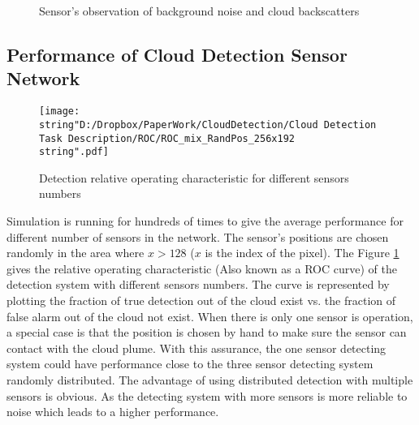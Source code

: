 \begin{figure}
\hfill{}\hfill{}\hfill{}\caption{Sensor's observation of background noise and cloud backscatters }
\end{figure}



\subsection{Performance of Cloud Detection Sensor Network}

\begin{figure}
\hfill{}\texttt{[image: \\string"D:/Dropbox/PaperWork/CloudDetection/Cloud Detection Task Description/ROC/ROC\_mix\_RandPos\_256x192\\string".pdf]}\hfill{}\hfill{}\caption{\label{fig:ROC-of-CDWSN}Detection relative operating characteristic
for different sensors numbers}
\end{figure}


Simulation is running for hundreds of times to give the average performance
for different number of sensors in the network. The sensor's positions
are chosen randomly in the area where $x>128$ ($x$ is the index
of the pixel). The Figure \ref{fig:ROC-of-CDWSN} gives the relative
operating characteristic (Also known as a ROC curve) of the detection
system with different sensors numbers. The curve is represented by
plotting the fraction of true detection out of the cloud exist vs.
the fraction of false alarm out of the cloud not exist. When there
is only one sensor is operation, a special case is that the position
is chosen by hand to make sure the sensor can contact with the cloud
plume. With this assurance, the one sensor detecting system could
have performance close to the three sensor detecting system randomly
distributed. The advantage of using distributed detection with multiple
sensors is obvious. As the detecting system with more sensors is more
reliable to noise which leads to a higher performance. 


